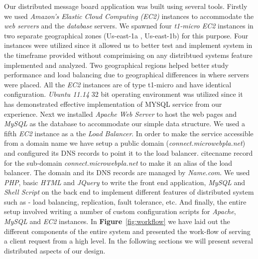 \documentclass[12pt]{article}
\begin{document}
Our distributed message board application was built using several tools. Firstly we
used \emph{Amazon's Elastic Cloud Computing (EC2)} \cite{ec2} instances to
accommodate the \emph{web servers} and the \emph{database} servers. We spawned
four  \emph{t1-micro EC2} \cite{t1micro} instances in two separate geographical
zones (Us-east-1a , Us-east-1b) for this purpose. Four instances were utilized
since it allowed us to better test and implement system in the timeframe
provided without comprimising on any distribtued systems feature implemented and
analyzed. Two geographical regions helped better study performance and load
balancing due to geographical differences in where servers were placed. All the
\emph{EC2} instances are of type t1-micro and have identical configuration.
\emph{Ubuntu 11.14} 32 bit operating environment was utilized since it has
demonstrated effective implementation of MYSQL service from our experience. Next
we installed \emph{Apache Web Server} \cite{apache} to host the web pages and
\emph{MySQL} \cite{mysql} as the database to accommodate our simple data
structure. We used a fifth \emph{EC2} instance as a the \emph{Load Balancer}. In
order to make the service accessible from a domain name we have setup a public
domain (\emph{connect.microwebpla.net}) and configured its DNS records to point
it to the load balancer. cite{cname} record for the sub-domain
\emph{connect.microwebpla.net} to make it an alias of the load balancer. The
domain and its DNS records are managed by \emph{Name.com}. We used \emph{PHP},
basic \emph{HTML} and \emph{JQuery} \cite{jquery} to write the front end
application, \emph{MySQL} and \emph{Shell Script} on the back end to implement
different features of distributed system such as - load balancing, replication,
fault tolerance, etc. And finally, the entire setup involved writing a number of
custom configuration scripts for \emph{Apache}, \emph{MySQL} and \emph{EC2}
instances. In  \textbf{Figure}~\ref{fig:workflow} we have laid out the different
components of the entire system and presented the work-flow of serving a client
request from a high level. In the following sections we will present several
distributed aspects of our design.
\end{document}
